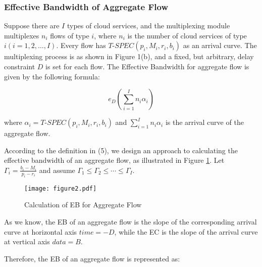 \documentclass[a4paper]{article}
\begin{document}
\subsubsection{Effective Bandwidth of Aggregate Flow}

Suppose there are $I$ types of cloud services, and the multiplexing module multiplexes $n_i$ flows of type $i$, where $n_i$ is the number of cloud services of type $i(i=1,2,…,I)$. Every flow has $T$-${SPEC(p_i, M_i, r_i, b_i)}$ as an arrival curve. The multiplexing process is as shown in Figure 1(b), and a fixed, but arbitrary, delay constraint $D$ is set for each flow. The Effective Bandwidth for aggregate flow is given by the following formula:

\[{e_D}(\sum\limits_{i = 1}^I {{n_i}{\alpha _i}} )\]

where ${\alpha_i=T}$-${SPEC(p_i, M_i, r_i, b_i)}$ and $\sum\limits_{i = 1}^I {{n_i}{\alpha _i}} $ is the arrival curve of the aggregate flow.

According to the definition in (5), we design an approach to calculating the effective bandwidth of an aggregate flow, as illustrated in Figure \ref{fig2}. Let ${\Gamma _i} = \frac{{{b_i} - {M_i}}}{{{p_i} - {r_i}}}$ and assume ${\Gamma _1} \le {\Gamma _2} \le  \cdots  \le {\Gamma _I}$.

\begin{figure}[h]
    \centering
    \texttt{[image: figure2.pdf]}
    \caption{Calculation of EB for Aggregate Flow}
    \label{fig2}
\end{figure}

As we know, the EB of an aggregate flow is the slope of the corresponding arrival curve at horizontal axis $time=-D$, while the EC is the slope of the arrival curve at vertical axis $data=B$.

Therefore, the EB of an aggregate flow is represented as:
\end{document}
